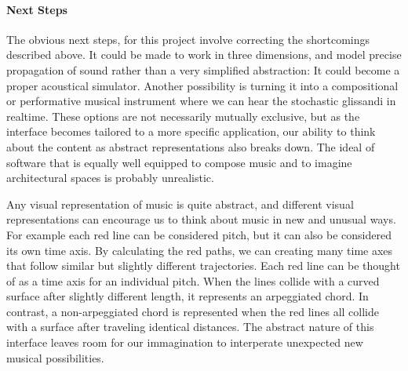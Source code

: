 \paragraph{Next Steps}
The obvious next steps, for this project involve correcting the
shortcomings described above. It could be made to work in three
dimensions, and model precise propagation of sound rather than a very
simplified abstraction: It could become a proper acoustical
simulator. Another possibility is turning it into a compositional or
performative musical instrument where we can hear the stochastic
glissandi in realtime. These options are not necessarily mutually
exclusive, but as the interface becomes tailored to a more specific
application, our ability to think about the content as abstract
representations also breaks down. The ideal of software that is
equally well equipped to compose music and to imagine architectural
spaces is probably unrealistic. 

Any visual representation of music is quite abstract, and different
visual representations can encourage us to think about music in new
and unusual ways. For example each red line can be considered pitch,
but it can also be considered its own time axis. By calculating the
red paths, we can creating many time axes that follow similar but
slightly different trajectories. Each red line can be thought of as a
time axis for an individual pitch. When the lines collide with a
curved surface after slightly different length, it represents an
arpeggiated chord. In contrast, a non-arpeggiated chord is represented
when the red lines all collide with a surface after traveling
identical distances. The abstract nature of this interface leaves room
for our immagination to interperate unexpected new musical
possibilities. 



